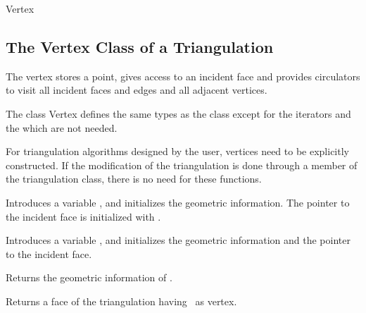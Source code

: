 \begin{ccClass}{Vertex}
\subsection{The Vertex Class of a Triangulation}
\label{I1_Sect_Triangulation_Vertex}

\ccThreeToTwo



\ccDefinition

The vertex stores a point, gives access to an incident face
and provides circulators to visit all incident faces and edges
and all adjacent vertices.


\ccTypes
The class  {Vertex} defines the same types 
as the class  except for the iterators and the 
 which are not needed.

\begin{ccAdvanced}
\ccCreation
For triangulation algorithms designed by the user, vertices need to be
explicitly constructed.  If the modification of the triangulation is
done through a member of the triangulation class, there is no need for these
functions.


{Introduces a variable \ccVar, and initializes the geometric information.
The pointer to the incident face is initialized with .}

{Introduces a variable \ccVar, and initializes the geometric information and 
the pointer to the incident face.}
\end{ccAdvanced}




{Returns  the geometric information of \ccVar.}

{Returns a face of the triangulation having  \ccVar\ as vertex.}

\begin{ccAdvanced}
\end{ccAdvanced}




\end{ccClass}
